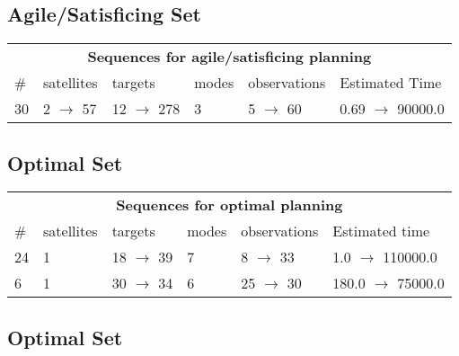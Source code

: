 \documentclass{article}
\begin{document}
                         \subsection*{Agile/Satisficing Set}

                        \begin{center}
                        \begin{tabular}{@{}l|l|l|l|l|l@{}}
                        \multicolumn{6}{c}{\bf \large Sequences for agile/satisficing planning}\\
                        \# & satellites & targets & modes & observations & Estimated Time\\\midrule
                        30&2 $\rightarrow$ 57&12 $\rightarrow$ 278&3&5 $\rightarrow$ 60&0.69 $\rightarrow$ 90000.0
                        \end{tabular}
                        \end{center}
                    
                            \subsection*{Optimal Set}

                            \begin{center}
                            \begin{tabular}{@{}l|l|l|l|l|l@{}}
                            \multicolumn{6}{c}{\bf \large Sequences for optimal planning}\\
                            \# & satellites & targets & modes & observations & Estimated time\\\midrule
                            24&1&18 $\rightarrow$ 39&7&8 $\rightarrow$ 33&1.0 $\rightarrow$ 110000.0\\
6&1&30 $\rightarrow$ 34&6&25 $\rightarrow$ 30&180.0 $\rightarrow$ 75000.0
                            \end{tabular}
                            \end{center}
                    
                                \subsection*{Optimal Set}
                                
\end{document}
